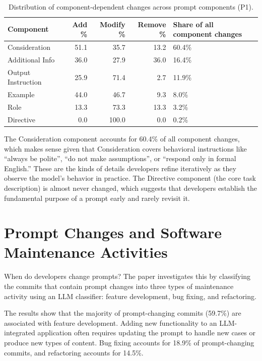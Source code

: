 \documentclass[
    pdftex,
    final,
    11pt,
    a4paper,
    parskip=false,
    oneside,
    footheight=0mm,
    footinclude=false,
    toc=bibliography
]{scrbook}
\begin{document}
\begin{table}[htbp]
\centering
\caption{Distribution of component-dependent changes across prompt components (P1).}
\label{tab:components}
\small
\begin{tabularx}{\linewidth}{lrrrl}
\toprule
\textbf{Component} & \textbf{Add \%} & \textbf{Modify \%} & \textbf{Remove \%} & \textbf{Share of all component changes} \\
\midrule
Consideration      & 51.1 & 35.7 & 13.2 & 60.4\% \\
Additional Info    & 36.0 & 27.9 & 36.0 & 16.4\% \\
Output Instruction & 25.9 & 71.4 & 2.7  & 11.9\% \\
Example            & 44.0 & 46.7 & 9.3  & 8.0\%  \\
Role               & 13.3 & 73.3 & 13.3 & 3.2\%  \\
Directive          & 0.0  & 100.0 & 0.0 & 0.2\%  \\
\bottomrule
\end{tabularx}
\end{table}

The Consideration component accounts for 60.4\% of all component changes, which makes sense given that Consideration covers behavioral instructions like ``always be polite'', ``do not make assumptions'', or ``respond only in formal English.'' These are the kinds of details developers refine iteratively as they observe the model's behavior in practice. The Directive component (the core task description) is almost never changed, which suggests that developers establish the fundamental purpose of a prompt early and rarely revisit it.

\section{Prompt Changes and Software Maintenance Activities}

When do developers change prompts? The paper investigates this by classifying the commits that contain prompt changes into three types of maintenance activity using an LLM classifier: feature development, bug fixing, and refactoring.

The results show that the majority of prompt-changing commits (59.7\%) are associated with feature development. Adding new functionality to an LLM-integrated application often requires updating the prompt to handle new cases or produce new types of content. Bug fixing accounts for 18.9\% of prompt-changing commits, and refactoring accounts for 14.5\%.
\end{document}
